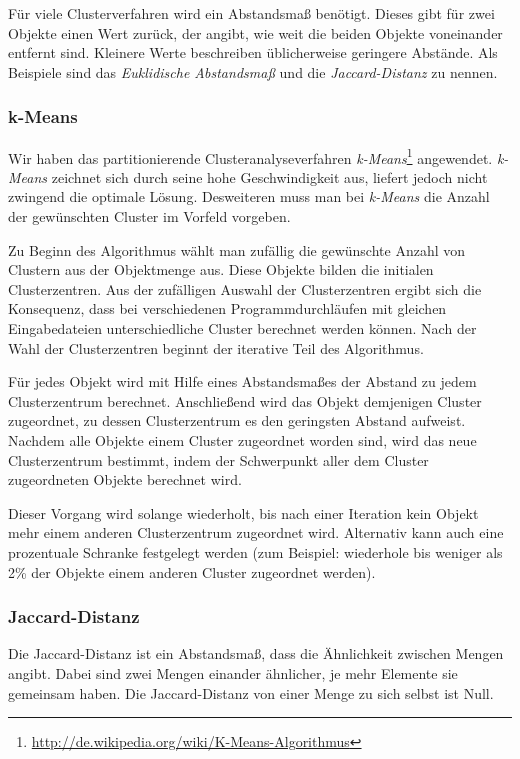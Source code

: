 \documentclass[a4paper]{llncs}
\begin{document}
Für viele Clusterverfahren wird ein Abstandsmaß benötigt. Dieses gibt für zwei Objekte einen Wert zurück, der angibt, wie weit die beiden Objekte voneinander entfernt sind. Kleinere Werte beschreiben üblicherweise geringere Abstände. 
Als Beispiele sind das \emph{Euklidische Abstandsmaß} und die \emph{Jaccard-Distanz} zu nennen.

\subsubsection{k-Means}
Wir haben das partitionierende Clusteranalyseverfahren \emph{k-Means}\footnote{\url{http://de.wikipedia.org/wiki/K-Means-Algorithmus}} angewendet. %
\emph{k-Means} zeichnet sich durch seine hohe Geschwindigkeit aus, liefert jedoch nicht zwingend die optimale Lösung. Desweiteren muss man bei \emph{k-Means} die Anzahl der gewünschten Cluster im Vorfeld vorgeben.

Zu Beginn des Algorithmus wählt man zufällig die gewünschte Anzahl von Clustern aus der Objektmenge aus. Diese Objekte bilden die initialen Clusterzentren. Aus der zufälligen Auswahl der Clusterzentren ergibt sich die Konsequenz, dass bei verschiedenen Programmdurchläufen mit gleichen Eingabedateien unterschiedliche Cluster berechnet werden können. Nach der Wahl der Clusterzentren beginnt der iterative Teil des Algorithmus.

Für jedes Objekt wird mit Hilfe eines Abstandsmaßes der Abstand zu jedem Clusterzentrum berechnet. Anschließend wird das Objekt demjenigen Cluster zugeordnet, zu dessen Clusterzentrum es den geringsten Abstand aufweist.
Nachdem alle Objekte einem Cluster zugeordnet worden sind, wird das neue Clusterzentrum bestimmt, indem der Schwerpunkt aller dem Cluster zugeordneten Objekte berechnet wird.

Dieser Vorgang wird solange wiederholt, bis nach einer Iteration kein Objekt mehr einem anderen Clusterzentrum zugeordnet wird. Alternativ kann auch eine prozentuale Schranke festgelegt werden (zum Beispiel: wiederhole bis weniger als 2\% der Objekte einem anderen Cluster zugeordnet werden).

\subsubsection{Jaccard-Distanz}
Die Jaccard-Distanz ist ein Abstandsmaß, dass die Ähnlichkeit zwischen Mengen angibt. Dabei sind zwei Mengen einander ähnlicher, je mehr Elemente sie gemeinsam haben. Die Jaccard-Distanz von einer Menge zu sich selbst ist Null.
\end{document}
